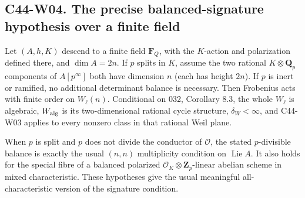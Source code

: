 \subsection*{C44-W04. The precise balanced-signature hypothesis over a finite field}

\begin{proposition}
Let $(A,h,K)$ descend to a finite field $\mathbf F_Q$, with the
$K$-action and polarization defined there, and $\dim A=2n$.
If $p$ splits in $K$, assume the two rational $K\otimes\mathbf Q_p$
components of $A[p^\infty]$ both have dimension $n$ (each has
height $2n$).  If $p$ is inert or ramified, no additional determinant
balance is necessary.  Then Frobenius acts with finite order on
$W_\ell(n)$.  Conditional on 032, Corollary 8.3, the whole
$W_\ell$ is algebraic, $W_{\rm alg}$ is its two-dimensional
rational cycle structure, $\delta_W<\infty$, and C44-W03 applies
to every nonzero class in that rational Weil plane.

When $p$ is split and $p$ does not divide the conductor of
$\mathcal O$, the stated $p$-divisible balance is exactly the usual
$(n,n)$ multiplicity condition on $\operatorname{Lie}A$.
It also holds for the special fibre of a balanced polarized
$\mathcal O_K\otimes\mathbf Z_p$-linear abelian scheme in mixed
characteristic.  These hypotheses give the usual meaningful
all-characteristic version of the signature condition.
\end{proposition}


